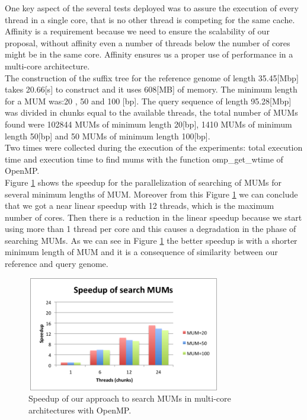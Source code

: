 \documentclass[3p,times]{elsarticle}
\begin{document}
One key aspect of the several tests deployed was to assure the execution of every thread in a single core, that is no other thread is competing for the same cache. Affinity is a requirement because we need to ensure the scalability of our proposal, without affinity even a number of threads below the number of cores might be in the same core. Affinity ensures us a proper use of performance in a multi-core architecture.\\
The construction of the suffix tree for the reference genome of length 35.45[Mbp] takes 20.66[s] to construct and it uses 608[MB] of memory. The minimum length for a MUM was:20 , 50 and 100 [bp]. The query sequence of length 95.28[Mbp] was divided in chunks equal to the available threads, the total number of MUMs found were 102844 MUMs of minimum length 20[bp], 1410 MUMs of minimum length 50[bp] and 50 MUMs of minimum length 100[bp].\\
Two times were collected during the execution of the experiments: total execution time and execution time to find mums with the function omp\_get\_wtime of OpenMP.\\
Figure \ref{fig:speedup} shows the speedup for the parallelization of searching of MUMs for several minimum lengths of MUM. Moreover from this Figure \ref{fig:speedup} we can conclude that we got a near linear speedup with 12 threads, which is the maximum number of cores. Then there is a reduction in the linear speedup because we start using more than 1 thread per core and this causes a degradation in the phase of searching MUMs. As we can see in Figure \ref{fig:speedup} the better speedup is with a shorter minimum length of MUM and it is a consequence of similarity between our reference and query genome.\\
\begin{figure}[htb]
  \centering
  \includegraphics[width=8.5cm,height=5cm]{speedup.png}
  \caption{Speedup of our approach to search MUMs in multi-core architectures with OpenMP.}
  \label{fig:speedup}
 \end{figure}  
\end{document}
